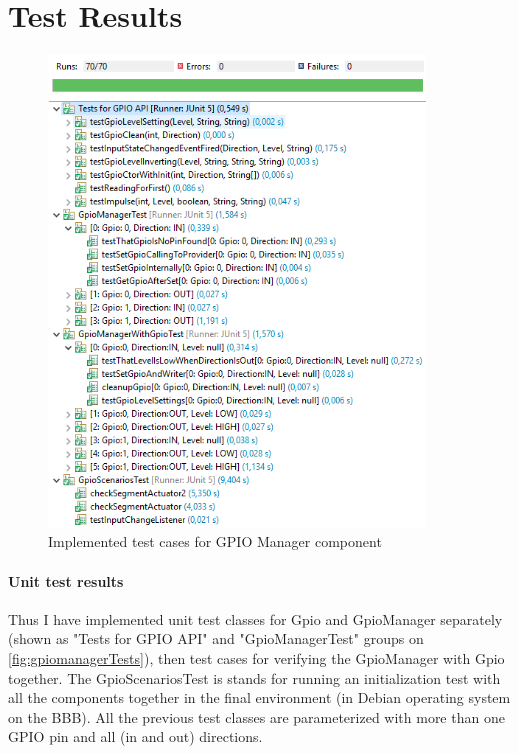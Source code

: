 \section{Test Results}
\begin{figure}[ht]
	\centering
	\includegraphics[width=100mm, keepaspectratio]{figures/impl/gpioTests.png}
	\caption{Implemented test cases for GPIO Manager component}
	\label{fig:gpiomanagerTests}
\end{figure}
\paragraph{Unit test results} Thus I have implemented unit test classes for Gpio and GpioManager separately (shown as "Tests for GPIO API" and "GpioManagerTest" groups on \autoref{fig:gpiomanagerTests}), then test cases for verifying the GpioManager with Gpio together. The GpioScenariosTest is stands for running an initialization test with all the components together in the final environment (in Debian operating system on the BBB). All the previous test classes are parameterized with more than one GPIO pin and all (in and out) directions.

